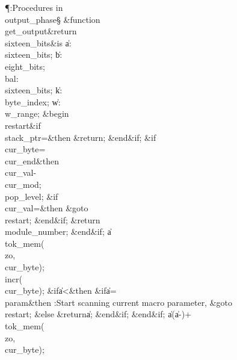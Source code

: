 \Y\P\?\4:Procedures in \\{output\_phase}\X\mathrel{+}\S\?\6
\&{function}\8\1\\{get\_output}\?\8\&{return}\?\8\\{sixteen\_bits}\2\8\&{is}\8%
\1\6
\|a\?:\?\\{sixteen\_bits};\6
\|b\?:\?\\{eight\_bits};\6
\\{bal}\?:\?\\{sixteen\_bits};\6
\|k\?:\?\\{byte\_index};\6
\|w\?:\?\\{w\_range};\6
\4\&{begin}\6
\4\BL\\{restart}\EL\8\&{if}\1\1\8\\{stack\_ptr}\?=\2\8\&{then}\6
\?\&{return}\?;\2\6
\&{end}\8\2\&{if}\1;\6
\&{if}\1\1\8\\{cur\_byte}\?=\?\\{cur\_end}\2\8\&{then}\6
\\{cur\_val}\?\K-\?\\{cur\_mod};\5
\\{pop\_level};\6
\&{if}\1\1\8\\{cur\_val}\?=\2\8\&{then}\6
\&{goto}\8\\{restart};\2\6
\&{end}\8\2\&{if}\1;\6
\?\&{return}\?\8\\{module\_number};\2\6
\&{end}\8\2\&{if}\1;\6
\|a\?\K\?\\{tok\_mem}\?\1(\?\\{zo}\?,\?\\{cur\_byte}\?\2)\?;\5
\\{incr}\?\1(\?\\{cur\_byte}\?\2)\?;\6
\&{if}\1\1\8\|a\?<\?\2\8\&{then}\6
\&{if}\1\1\8\|a\?=\?\\{param}\2\8\&{then}\6
:Start scanning current macro parameter, \&{goto}\8\\{restart}\X;\6
\4\&{else}\6
\?\&{return}\?\8\|a;\2\6
\&{end}\8\2\&{if}\1;\2\6
\&{end}\8\2\&{if}\1;\6
\|a\?\K\1(\?\|a\?-\2)\ast{}+\?\\{tok\_mem}\?\1(\?\\{zo}\?,%
\?\\{cur\_byte}\?\2)\?;\5

